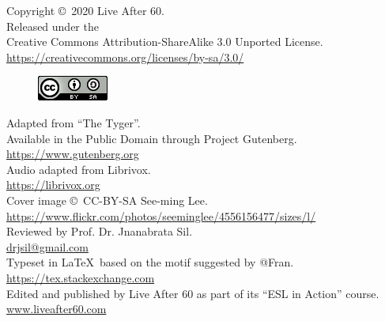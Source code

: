\documentclass[oneside]{book}
\begin{document}
\newpage
\frontmatter
\vspace*{15ex}
\begin{center}
  Copyright \copyright\ 2020 Live After 60.\\
  Released under the \\
  Creative Commons Attribution-ShareAlike 3.0 Unported License.\\
  \href{https://creativecommons.org/licenses/by-sa/3.0/}{
    https://creativecommons.org/licenses/by-sa/3.0/}
  \begin{figure}[H]
    \centering
    \includegraphics[scale=0.8]{cc-by-sa}
  \end{figure}
  Adapted from ``The Tyger''.\\ 
  Available in the Public Domain through Project Gutenberg.\\
  \href{https://www.gutenberg.org}{https://www.gutenberg.org}\\
  \bigskip
  Audio adapted from Librivox.\\
  \href{https://librivox.org}{https://librivox.org}\\
  \bigskip
  Cover image \copyright\ CC-BY-SA See-ming Lee.\\
  \href{https://www.flickr.com/photos/seeminglee/4556156477/sizes/l/}{https://www.flickr.com/photos/seeminglee/4556156477/sizes/l/}\\
  \bigskip
  Reviewed by Prof. Dr. Jnanabrata Sil.\\
  \href{drjsil@gmail.com}{drjsil@gmail.com} \\
  \bigskip
  Typeset in \LaTeX\ based on the motif suggested by @Fran. \\
  \href{https://tex.stackexchange.com}{https://tex.stackexchange.com} \\
  \bigskip
  Edited and published by Live After 60 as part of its ``ESL in Action''
	course.\\
  \href{http://www.liveafter60.com}{www.liveafter60.com}
\end{center}
\vspace*{15ex}
\end{document}
